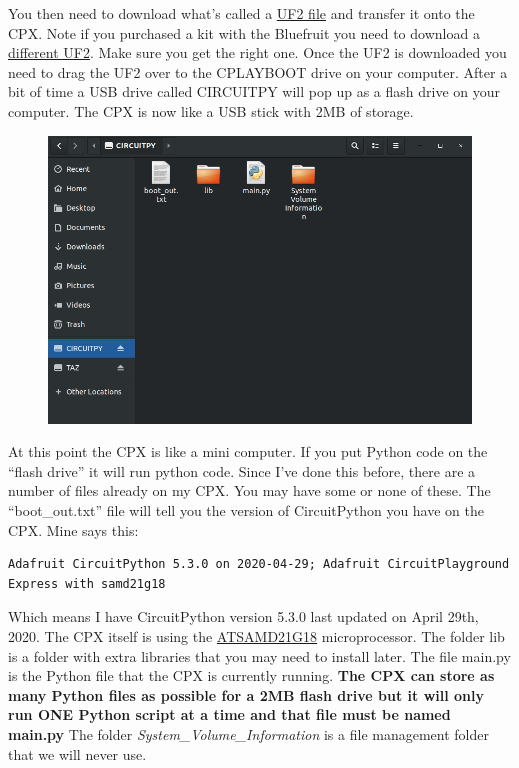 You then need to download what’s called a \href{https://circuitpython.org/board/circuitplayground_express/}{UF2 file} and transfer it
onto the CPX. Note if you purchased a kit with the Bluefruit you need
to download a
\href{https://circuitpython.org/board/circuitplayground_bluefruit/}{different
  UF2}. Make sure you get the right one. Once the 
UF2 is downloaded you need to drag the UF2 over to the CPLAYBOOT drive
on your computer. After a bit of time a USB drive called CIRCUITPY
will pop up as a flash drive on your computer. The CPX is now like a
USB stick with 2MB of storage. 
\begin{figure}[H]
  \begin{center}
    \includegraphics[width=\textwidth]{Figures/CIRCUITPY.png}
  \end{center}
\end{figure}
At this point the CPX is like a mini computer. If you put Python code
on the “flash drive” it will run python code. Since I’ve done this
before, there are a number of files already on my CPX. You may have
some or none of these. The “boot_out.txt” file will tell you the
version of CircuitPython you have on the CPX. Mine says this:
\begin{verbatim}
Adafruit CircuitPython 5.3.0 on 2020-04-29; Adafruit CircuitPlayground Express with samd21g18
\end{verbatim}
Which means I have CircuitPython version 5.3.0 last updated on April
29th, 2020. The CPX itself is using the \href{https://www.microchip.com/wwwproducts/en/ATsamd21g18}{ATSAMD21G18}
microprocessor. The folder lib is a folder with extra libraries that
you may need to install later. The file main.py is the Python file
that the CPX is currently running. {\bf The CPX can store as many Python
files as possible for a 2MB flash drive but it will only run ONE
Python script at a time and that file must be named main.py} The folder
{\it System\_Volume\_Information} is a file management folder that we will
never use.

